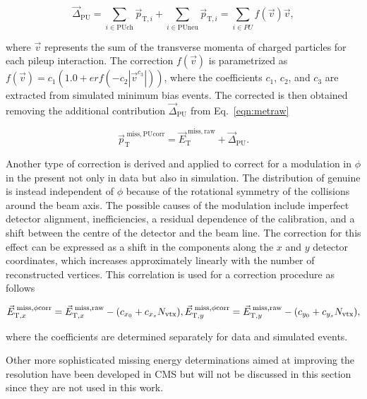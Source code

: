 \begin{equation}
{\vec \Delta}_\mathrm{PU} = \sum_{i \in \mathrm{PUch}} {\vec p}_{\mathrm{T},i} + \sum_{i \in \mathrm{PUneu}} {\vec p}_{\mathrm{T},i} = \sum_{i \in PU} f({\vec v}) {\vec v},
\end{equation}

where ${\vec v}$ represents the sum of the transverse momenta of charged particles for each pileup interaction.
The correction $f({\vec v})$ is parametrized as $f({\vec v}) = c_1 (1.0 +erf(-c_2|{\vec v}^{c_3}|))$, where the coefficients $c_1$, $c_2$, and $c_3$ are extracted from simulated minimum bias events.
The corrected \ptvecmiss is then obtained removing the additional contribution ${\vec \Delta}_\mathrm{PU}$ from Eq.~\ref{eqn:metraw}

\begin{equation}
{\vec p}_\mathrm{T}^\mathrm{\; miss,PUcorr} = {\vec E}_\mathrm{T}^\mathrm{\; miss,raw} + {\vec \Delta}_\mathrm{PU}.
\end{equation}

Another type of correction is derived and applied to correct for a modulation in $\phi$ in the \ptvecmiss present not only in data but also in simulation. The distribution of genuine \ptvecmiss is instead independent of $\phi$ because of the rotational symmetry of the collisions around the beam axis. The possible causes of the modulation include imperfect detector alignment, inefficiencies, a residual \pt dependence of the calibration, and a shift between the centre of the detector and the beam line. The correction for this effect can be expressed as a shift in the \ptvecmiss components along the $x$ and $y$ detector coordinates, which increases approximately linearly with the number of reconstructed vertices. This correlation is used for a correction procedure as follows

\begin{equation}
{\vec E}_{\mathrm{T},x}^\mathrm{\; miss,\phi corr} = {\vec E}_{\mathrm{T},x}^\mathrm{\; miss,raw} - (c_{x_0} + c_{x_s}N_\mathrm{vtx}),\\
{\vec E}_{\mathrm{T},y}^\mathrm{\; miss,\phi corr} = {\vec E}_{\mathrm{T},y}^\mathrm{\; miss,raw} - (c_{y_0} + c_{y_s}N_\mathrm{vtx}),
\end{equation}

where the coefficients are determined separately for data and simulated events.

Other more sophisticated missing energy determinations aimed at improving the resolution have been developed in CMS\cite{Khachatryan:2014gga,CMS-PAS-JME-16-004} but will not be discussed in this section since they are not used in this work.\\

